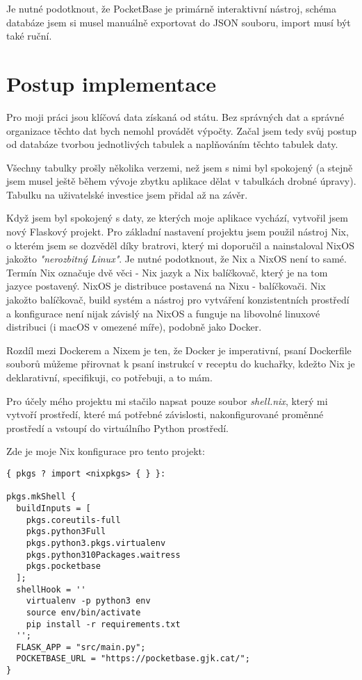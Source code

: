 \documentclass[11pt,a4paper,twoside,openright]{report}
\begin{document}
Je nutné podotknout, že PocketBase je primárně interaktivní nástroj, schéma databáze jsem si musel
manuálně exportovat do JSON souboru, import musí být také ruční.

\section{Postup implementace}

Pro moji práci jsou klíčová data získaná od státu. Bez správných dat a správné organizace těchto dat
bych nemohl provádět výpočty. Začal jsem tedy svůj postup od databáze tvorbou jednotlivých tabulek
a naplňováním těchto tabulek daty.

Všechny tabulky prošly několika verzemi, než jsem s nimi byl spokojený (a stejně jsem musel ještě
během vývoje zbytku aplikace dělat v tabulkách drobné úpravy). Tabulku na uživatelské investice
jsem přidal až na závěr.

Když jsem byl spokojený s daty, ze kterých moje aplikace vychází, vytvořil jsem nový Flaskový projekt.
Pro základní nastavení projektu jsem použil nástroj Nix, o kterém jsem se dozvěděl díky bratrovi, který
mi doporučil a nainstaloval NixOS jakožto \emph{"nerozbitný Linux"}. Je nutné podotknout, že Nix a NixOS
není to samé. Termín Nix označuje dvě věci - Nix jazyk a Nix balíčkovač, který je na tom jazyce postavený.
NixOS je distribuce postavená na Nixu - balíčkovači. Nix jakožto balíčkovač, build systém a nástroj pro
vytváření konzistentních prostředí a konfigurace není nijak závislý na NixOS a funguje na libovolné
linuxové distribuci (i macOS v omezené míře), podobně jako Docker.

Rozdíl mezi Dockerem a Nixem je ten, že Docker je imperativní, psaní Dockerfile souborů můžeme přirovnat
k psaní instrukcí v receptu do kuchařky, kdežto Nix je deklarativní, specifikuji, co potřebuji, a to mám.

Pro účely mého projektu mi stačilo napsat pouze soubor \emph{shell.nix}, který mi vytvoří prostředí,
které má potřebné závislosti, nakonfigurované proměnné prostředí a vstoupí do virtuálního Python prostředí.

Zde je moje Nix konfigurace pro tento projekt:
\begin{verbatim}
{ pkgs ? import <nixpkgs> { } }:

pkgs.mkShell {
  buildInputs = [
    pkgs.coreutils-full
    pkgs.python3Full
    pkgs.python3.pkgs.virtualenv
    pkgs.python310Packages.waitress
    pkgs.pocketbase
  ];
  shellHook = ''
    virtualenv -p python3 env
    source env/bin/activate
    pip install -r requirements.txt
  '';
  FLASK_APP = "src/main.py";
  POCKETBASE_URL = "https://pocketbase.gjk.cat/";
}
\end{verbatim}
\end{document}
